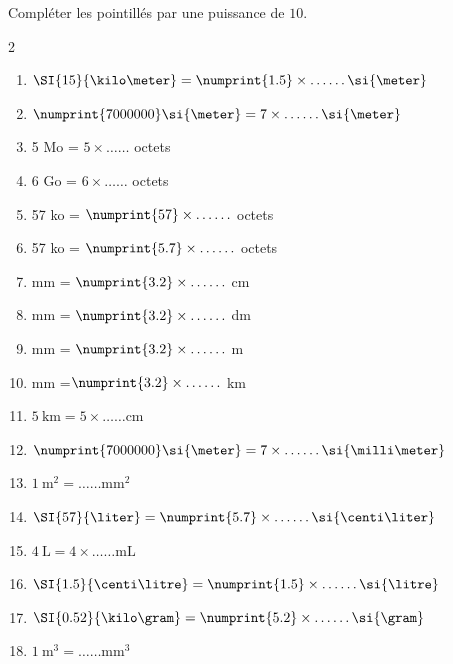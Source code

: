 \documentclass[main.tex]{subfiles}
\begin{document}
 \begin{exercise}Compléter les pointillés par une puissance de $10$.
 	\begin{multicols}{2}
 		\begin{enumerate}[label={\alph*)\rule{0pt}{1.8em}},leftmargin=*]
 			\item $\SI{15}{\kilo\meter}=\numprint{1.5}\times\ldots\ldots \si{\meter}$
 			\item $\numprint{7000000}\si{\meter}=7\times \ldots\ldots\si{\meter}$
 			\item  5 Mo = $5\times \ldots\ldots$ octets
 			\item  6 Go = $6\times \ldots\ldots$ octets
 			\item  57 ko = $\numprint{57}\times \ldots\ldots$ octets
 			\item  57 ko = $\numprint{5.7}\times \ldots\ldots$ octets
			\item {}\si{\milli\meter} = $\numprint{3.2}\times \ldots\ldots$ \si{\centi\meter}
 			\item {}\si{\milli\meter} = $\numprint{3.2}\times \ldots\ldots$ \si{\deci\meter}
 			\item {}\si{\milli\meter} = $\numprint{3.2}\times \ldots\ldots$ \si{\meter}
 			\item {}\si{\milli\meter} =$\numprint{3.2}\times \ldots\ldots$ \si{\kilo\meter}
 			\item $\SI{5}{\kilo\meter}=5\times \ldots\ldots \si{\centi\meter}$ 
 			\item $\numprint{7000000}\si{\meter}=7\times \ldots\ldots\si{\milli\meter}$
 			\item $\SI{1}{\meter^2}=\ldots\ldots \si{\milli\meter^2}$
 			\item $\SI{57}{\liter}=\numprint{5.7}\times\ldots\ldots \si{\centi\liter}$
 			\item $\SI{4}{\liter}=4\times \ldots\ldots \si{\milli\liter}$
 			\item $\SI{1.5}{\centi\litre} = \numprint{1.5}\times \ldots\ldots  \si{\litre}$
 			\item $\SI{0.52}{\kilo\gram}=\numprint{5.2}\times \ldots\ldots \si{\gram}$
 			\item $\SI{1}{\meter^3}=\ldots\ldots \si{\milli\meter^3}$
 		\end{enumerate}
 	\end{multicols}
 \end{exercise} 
\end{document}
